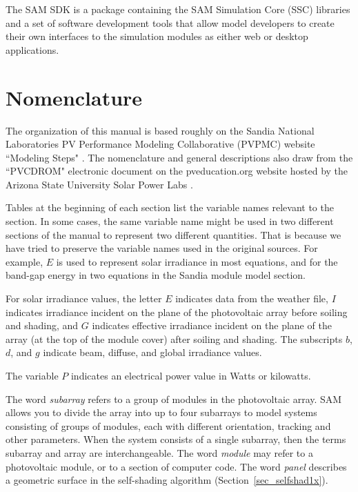 \documentclass[12pt,letterpaper]{article}
\begin{document}
The SAM SDK is a package containing the SAM Simulation Core (SSC) libraries and a set of software development tools that allow model developers to create their own interfaces to the simulation modules as either web or desktop applications.

\mainmatter
\tableofcontents
\listoffigures
\listoftables

\chapter{Nomenclature}

The organization of this manual is based roughly on the Sandia National Laboratories PV Performance Modeling Collaborative (PVPMC) website ``Modeling Steps" \citep{pvpmc}. The nomenclature and general descriptions also draw from the ``PVCDROM" electronic document on the pveducation.org website hosted by the Arizona State University Solar Power Labs \citep{pvcdrom}.

Tables at the beginning of each section list the variable names relevant to the section. In some cases, the same variable name might be used in two different sections of the manual to represent two different quantities. That is because we have tried to preserve the variable names used in the original sources. For example, $E$ is used to represent solar irradiance in most equations, and for the band-gap energy in two equations in the Sandia module model section.

For solar irradiance values, the letter $E$ indicates data from the weather file, $I$ indicates irradiance incident on the plane of the photovoltaic array before soiling and shading, and $G$ indicates effective irradiance incident on the plane of the array (at the top of the module cover) after soiling and shading. The subscripts $b$, $d$, and $g$ indicate beam, diffuse, and global irradiance values.

The variable $P$ indicates an electrical power value in Watts or kilowatts.

The word \textit{subarray} refers to a group of modules in the photovoltaic array. SAM allows you to divide the array into up to four subarrays to model systems consisting of groups of modules, each with different orientation, tracking and other parameters. When the system consists of a single subarray, then the terms subarray and array are interchangeable. The word \textit{module} may refer to a photovoltaic module, or to a section of computer code. The word \textit{panel} describes a geometric surface in the self-shading algorithm (Section~\ref{sec_selfshad1x}).
\end{document}
